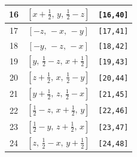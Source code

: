 \documentclass[fleqn,8pt]{jsarticle}
\begin{document}
\begin{longtable}{ccc}
16 & $\left[ x + \frac{1}{2},\, y,\, \frac{1}{2} - z \right]$ & {\tt [16,40]} \\ \hline
17 & $\left[ - z,\, - x,\, - y \right]$ & {\tt [17,41]} \\ \hline
18 & $\left[ - y,\, - z,\, - x \right]$ & {\tt [18,42]} \\ \hline
19 & $\left[ y,\, \frac{1}{2} - z,\, x + \frac{1}{2} \right]$ & {\tt [19,43]} \\ \hline
20 & $\left[ z + \frac{1}{2},\, x,\, \frac{1}{2} - y \right]$ & {\tt [20,44]} \\ \hline
21 & $\left[ y + \frac{1}{2},\, z,\, \frac{1}{2} - x \right]$ & {\tt [21,45]} \\ \hline
22 & $\left[ \frac{1}{2} - z,\, x + \frac{1}{2},\, y \right]$ & {\tt [22,46]} \\ \hline
23 & $\left[ \frac{1}{2} - y,\, z + \frac{1}{2},\, x \right]$ & {\tt [23,47]} \\ \hline
24 & $\left[ z,\, \frac{1}{2} - x,\, y + \frac{1}{2} \right]$ & {\tt [24,48]} \\
\end{longtable}
\end{document}
